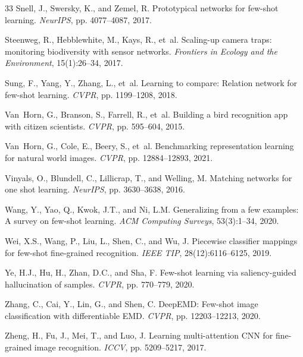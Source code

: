 \begin{thebibliography}{33}
Snell, J., Swersky, K., and Zemel, R.
\newblock Prototypical networks for few-shot learning.
\newblock \emph{NeurIPS}, pp. 4077--4087, 2017.

Steenweg, R., Hebblewhite, M., Kays, R., et~al.
\newblock Scaling-up camera traps: monitoring biodiversity with sensor networks.
\newblock \emph{Frontiers in Ecology and the Environment}, 15(1):26--34, 2017.

Sung, F., Yang, Y., Zhang, L., et~al.
\newblock Learning to compare: Relation network for few-shot learning.
\newblock \emph{CVPR}, pp. 1199--1208, 2018.

Van~Horn, G., Branson, S., Farrell, R., et~al.
\newblock Building a bird recognition app with citizen scientists.
\newblock \emph{CVPR}, pp. 595--604, 2015.

Van~Horn, G., Cole, E., Beery, S., et~al.
\newblock Benchmarking representation learning for natural world images.
\newblock \emph{CVPR}, pp. 12884--12893, 2021.

Vinyals, O., Blundell, C., Lillicrap, T., and Welling, M.
\newblock Matching networks for one shot learning.
\newblock \emph{NeurIPS}, pp. 3630--3638, 2016.

Wang, Y., Yao, Q., Kwok, J.T., and Ni, L.M.
\newblock Generalizing from a few examples: A survey on few-shot learning.
\newblock \emph{ACM Computing Surveys}, 53(3):1--34, 2020.

Wei, X.S., Wang, P., Liu, L., Shen, C., and Wu, J.
\newblock Piecewise classifier mappings for few-shot fine-grained recognition.
\newblock \emph{IEEE TIP}, 28(12):6116--6125, 2019.

Ye, H.J., Hu, H., Zhan, D.C., and Sha, F.
\newblock Few-shot learning via saliency-guided hallucination of samples.
\newblock \emph{CVPR}, pp. 770--779, 2020.

Zhang, C., Cai, Y., Lin, G., and Shen, C.
\newblock DeepEMD: Few-shot image classification with differentiable EMD.
\newblock \emph{CVPR}, pp. 12203--12213, 2020.

Zheng, H., Fu, J., Mei, T., and Luo, J.
\newblock Learning multi-attention CNN for fine-grained image recognition.
\newblock \emph{ICCV}, pp. 5209--5217, 2017.

\end{thebibliography}

\appendix
